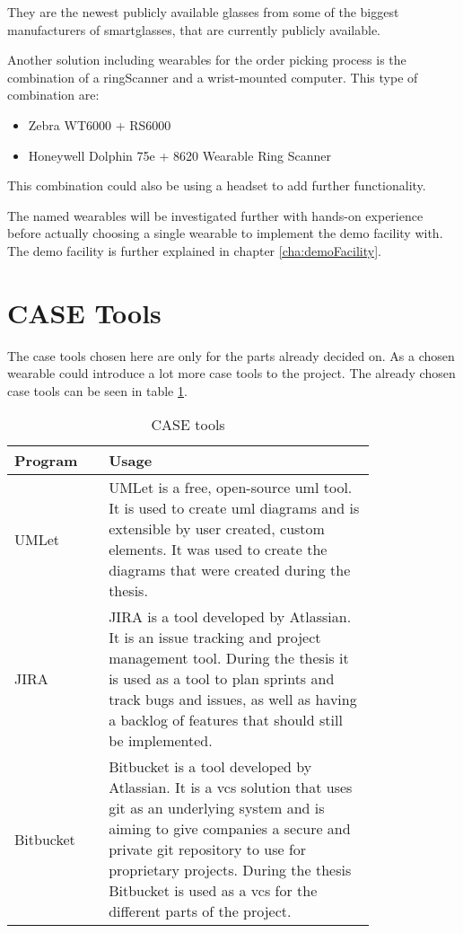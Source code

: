 They are the newest publicly available glasses from some of the biggest manufacturers of \gls{smartglasses}, that are currently publicly available.

Another solution including wearables for the order picking process is the combination of a \gls{ringScanner} and a wrist-mounted computer. This type of combination are:

\begin{itemize}
	\item Zebra WT6000 + RS6000
	\item Honeywell Dolphin 75e + 8620 Wearable Ring Scanner
\end{itemize}

This combination could also be using a headset to add further functionality.

The named wearables will be investigated further with hands-on experience before actually choosing a single wearable to implement the demo facility with. The demo facility is further explained in chapter \ref{cha:demoFacility}.

\cleardoublepage

\section{CASE Tools}\label{sec:caseTools}
The \gls{case} tools chosen here are only for the parts already decided on. As a chosen wearable could introduce a lot more \gls{case} tools to the project. The already chosen \gls{case} tools can be seen in table \ref{tab:case}.

\begin{table}[htbp]
	\begin{center}
	\begin{tabular}{|p{0.2\linewidth}|p{0.6\linewidth}|} \hline
	\textbf{Program} & \textbf{Usage} \\ \hline
	UMLet & UMLet is a free, open-source \gls{uml} tool. It is used to create \gls{uml} diagrams and is extensible by user created, custom elements. \citep{website:umlet} It was used to create the diagrams that were created during the thesis.  \\ \hline
	JIRA & JIRA is a tool developed by Atlassian. It is an issue tracking and project management tool. During the thesis it is used as a tool to plan sprints and track bugs and issues, as well as having a backlog of features that should still be implemented. \\ \hline
	Bitbucket & Bitbucket is a tool developed by Atlassian. It is a \gls{vcs} solution that uses git as an underlying system and is aiming to give companies a secure and private git repository to use for proprietary projects. During the thesis Bitbucket is used as a \gls{vcs} for the different parts of the project. \\ \hline
	\end{tabular}
	\end{center}
	\caption{CASE tools}\label{tab:case}
\end{table}